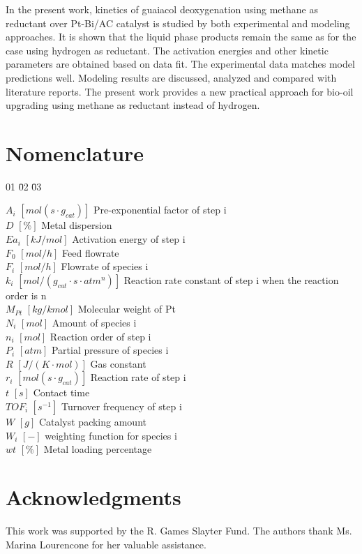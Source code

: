 \documentclass[journal=iecred,manuscript=article]{achemso}
\begin{document}
In the present work, kinetics of guaiacol deoxygenation using methane as reductant over Pt-Bi/AC catalyst is 
studied by both experimental and modeling approaches.
It is shown that the liquid phase products remain the same as for the case using hydrogen as reductant.\cite{Gao2015}
The activation energies and other kinetic parameters are obtained based on data fit.
The experimental data matches model predictions well.
Modeling results are discussed, analyzed and compared with literature reports.
The present work provides a new practical approach for bio-oil upgrading
using methane as reductant instead of hydrogen.

\section{Nomenclature}

\begin{tabbing}

01\hspace*{50bp} \=02\hspace*{90bp} \=03\hspace*{50bp}\kill

$A_i$  \> $[mol\left(s \cdot g_{cat}\right)]$   \> Pre-exponential factor of step i \\
$D$  \> $[\%]$   \> Metal dispersion\\
$Ea_i$  \> $[kJ/mol]$   \> Activation energy of step i \\
$F_0$  \> $[mol/h]$   \> Feed flowrate \\
$F_i$  \> $[mol/h]$   \> Flowrate of species i \\
$k_i$  \> $[mol/(g_{cat} \cdot s \cdot atm^n) ]$   \> Reaction rate constant of step i when the reaction order is n\\
$M_{Pt}$  \> $[kg/kmol]$   \> Molecular weight of Pt \\
$N_i$  \> $[mol]$   \> Amount of species i \\
$n_i$  \> $[mol]$   \> Reaction order of step  i \\
$P_i$  \> $[atm]$   \> Partial pressure of species i \\
$R$  \> $[J/\left(K \cdot mol \right)]$   \> Gas constant \\
$r_i$  \> $[mol\left(s \cdot g_{cat}\right)]$  \> Reaction rate of step i \\
$t$  \> $[s]$   \> Contact time \\
$TOF_i$  \> $[s^{-1}]$  \> Turnover frequency of step i \\
$W$  \> $[g]$   \> Catalyst packing amount\\
$W_i$  \> $[-]$   \> weighting function for species i\\
$wt$  \> $[\%]$   \> Metal loading percentage \\
\end{tabbing}

\section{Acknowledgments}
This work was supported by the R. Games Slayter Fund.
The authors thank Ms. Marina Lourencone for her valuable assistance.


\end{document}
